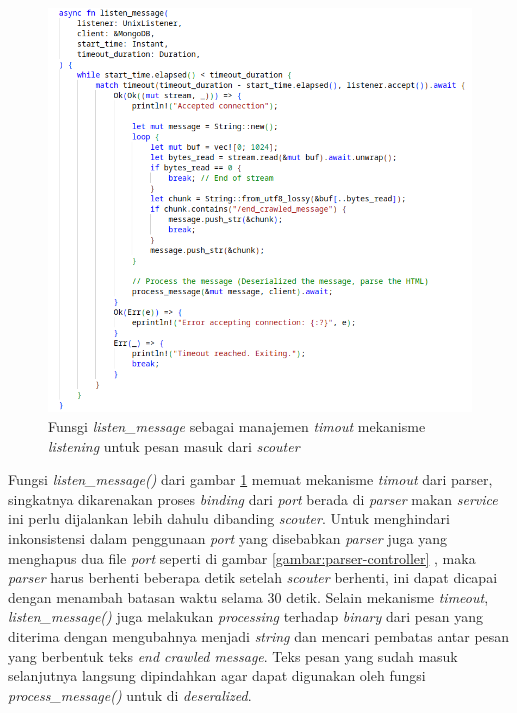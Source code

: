 \begin{figure}[H]
  \centering
  \includegraphics[keepaspectratio, width=13cm]{gambar/parser-listen-message.png}
  \caption{Funsgi \emph{listen\_message} sebagai manajemen \emph{timout} mekanisme \emph{listening} untuk pesan masuk dari \emph{scouter}}
  \label{gambar:parser-listen-message}
\end{figure}

Fungsi \emph{listen\_message()} dari gambar \ref{gambar:parser-listen-message} memuat mekanisme \emph{timout} dari parser, singkatnya dikarenakan proses \emph{binding} dari \emph{port} berada di \emph{parser} makan \emph{service} ini perlu dijalankan lebih dahulu dibanding \emph{scouter}. Untuk menghindari inkonsistensi dalam penggunaan \emph{port} yang disebabkan \emph{parser} juga yang menghapus dua file \emph{port} seperti di gambar \ref{gambar:parser-controller} , maka \emph{parser} harus berhenti beberapa detik setelah \emph{scouter} berhenti, ini dapat dicapai dengan menambah batasan waktu selama 30 detik. Selain mekanisme \emph{timeout}, \emph{listen\_message()} juga melakukan \emph{processing} terhadap \emph{binary} dari pesan yang diterima dengan mengubahnya menjadi \emph{string} dan mencari pembatas antar pesan yang berbentuk teks \emph{end crawled message}. Teks pesan yang sudah masuk selanjutnya langsung dipindahkan agar dapat digunakan oleh fungsi \emph{process\_message()} untuk di \emph{deseralized}.

